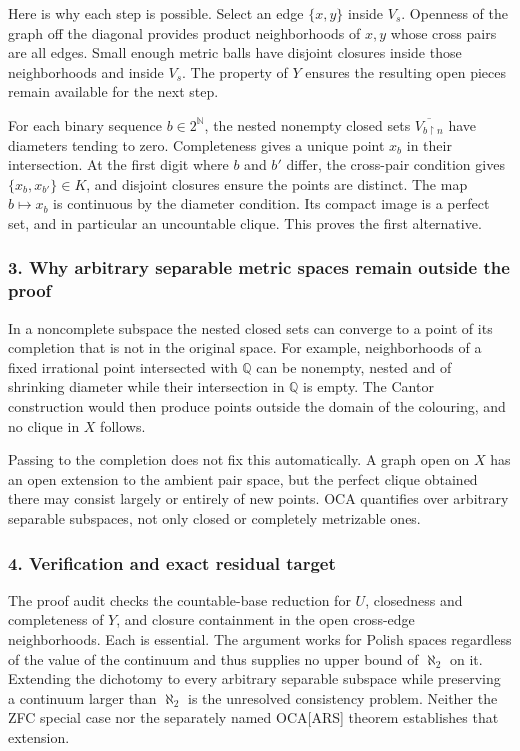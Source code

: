 \documentclass[11pt,a4paper]{article}
\begin{document}
Here is why each step is possible. Select an edge $\{x,y\}$ inside $V_s$. Openness of the graph off the diagonal provides product neighborhoods of $x,y$ whose cross pairs are all edges. Small enough metric balls have disjoint closures inside those neighborhoods and inside $V_s$. The property of $Y$ ensures the resulting open pieces remain available for the next step.

For each binary sequence $b\in2^{\mathbb N}$, the nested nonempty closed sets $\overline{V_{b\upharpoonright n}}$ have diameters tending to zero. Completeness gives a unique point $x_b$ in their intersection. At the first digit where $b$ and $b'$ differ, the cross-pair condition gives $\{x_b,x_{b'}\}\in K$, and disjoint closures ensure the points are distinct. The map $b\mapsto x_b$ is continuous by the diameter condition. Its compact image is a perfect set, and in particular an uncountable clique. This proves the first alternative.

\subsubsection{3. Why arbitrary separable metric spaces remain outside the proof}
In a noncomplete subspace the nested closed sets can converge to a point of its completion that is not in the original space. For example, neighborhoods of a fixed irrational point intersected with $\mathbb Q$ can be nonempty, nested and of shrinking diameter while their intersection in $\mathbb Q$ is empty. The Cantor construction would then produce points outside the domain of the colouring, and no clique in $X$ follows.

Passing to the completion does not fix this automatically. A graph open on $X$ has an open extension to the ambient pair space, but the perfect clique obtained there may consist largely or entirely of new points. OCA quantifies over arbitrary separable subspaces, not only closed or completely metrizable ones.

\subsubsection{4. Verification and exact residual target}
The proof audit checks the countable-base reduction for $U$, closedness and completeness of $Y$, and closure containment in the open cross-edge neighborhoods. Each is essential. The argument works for Polish spaces regardless of the value of the continuum and thus supplies no upper bound of $\aleph_2$ on it. Extending the dichotomy to every arbitrary separable subspace while preserving a continuum larger than $\aleph_2$ is the unresolved consistency problem. Neither the ZFC special case nor the separately named OCA[ARS] theorem establishes that extension.
\end{document}
